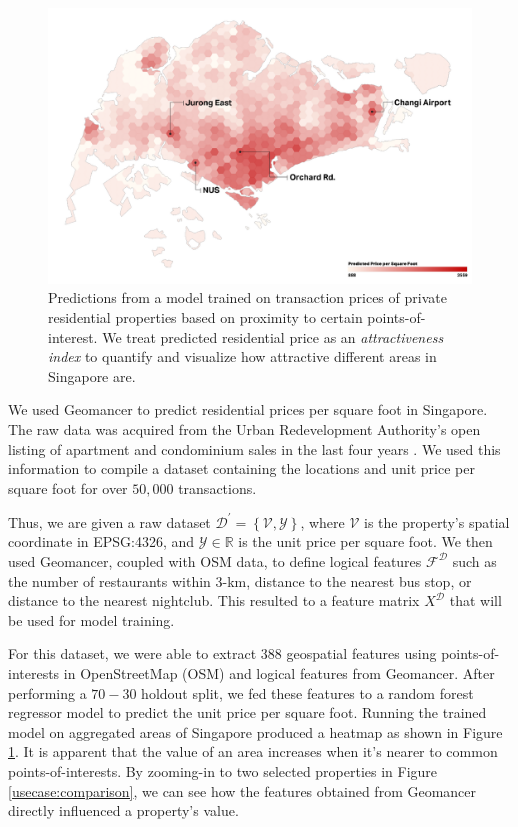 \documentclass{article}
\begin{document}
\begin{figure}[!ht]
    \begin{center}
        \includegraphics[width=0.85\linewidth]{heatmap.pdf}
    \end{center}
    \caption{
        Predictions from a model trained on transaction prices of private
        residential properties based on proximity to certain
        points-of-interest. We treat predicted residential price as an
        \textit{attractiveness index} to quantify and visualize how attractive
        different areas in Singapore are.
    }
  \label{usecase:heatmap}
\end{figure}

We used Geomancer to predict residential prices per square foot in Singapore. 
The raw data was acquired from the Urban Redevelopment Authority's
open listing of apartment and condominium sales in the last
four years \cite{ura2019property}. We used this information to compile a
dataset containing the locations and unit price per square foot for over $50,000$
transactions.

Thus, we are given a raw dataset $\mathcal{D}^{\prime} = \left\{\mathcal{V},
\mathcal{Y}\right\}$, where $\mathcal{V}$ is the property's spatial coordinate
in EPSG:4326, and $\mathcal{Y} \in \mathbb{R}$ is the unit price per square
foot. We then used Geomancer, coupled with OSM data, to define logical features
$\mathcal{F}^{\mathcal{D}}$ such as the number of restaurants within 3-km,
distance to the nearest bus stop, or distance to the nearest nightclub. This
resulted to a feature matrix $X^{\mathcal{D}}$ that will be used for model
training. 

For this dataset, we were able to extract $388$ geospatial features using
points-of-interests in OpenStreetMap (OSM) and logical features from Geomancer.
After performing a $70-30$ holdout split, we fed these features to a random
forest regressor model \cite{breiman2001random, geurts2006extremely} to predict
the unit price per square foot. Running the trained model on aggregated areas
of Singapore produced a heatmap as shown in Figure \ref{usecase:heatmap}. It is
apparent that the value of an area increases when it's nearer to common
points-of-interests. By zooming-in to two selected properties in Figure
\ref{usecase:comparison}, we can see how the features obtained from Geomancer
directly influenced a property's value.
\end{document}

